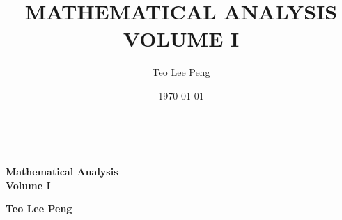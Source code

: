 \documentclass[12pt]{tlpbook}
\newcommand{\bookauthor}{Teo Lee Peng}
\newcommand{\booktitle}{Mathematical Analysis\\Volume I}
\begin{document}
  \begin{coverpage}
~\vspace{2cm}
\begin{center}
{\fontsize{24}{28}\selectfont \textcolor{covertext}{  {\bfseries {\booktitle}} }


\vspace{6cm}

\textcolor{covertext}{{ \bfseries{\bookauthor}}}


}
\end{center}
 \end{coverpage}

\pagecolor{white}
\title{\uppercase{\booktitle}}

\author{\bookauthor}

\dedication{}


\date{\today}








\maketitle

 \frontmatter
\setcounter{page}{1}
\hypersetup{linkcolor=darkblue}

\tableofcontents
 



 
\mainmatter


 



\backmatter

\begin{coverpage}
~
 \end{coverpage}
\end{document}
